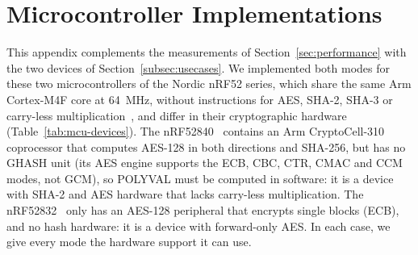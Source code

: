 
\section{Microcontroller Implementations}
\label{app:mcu}

This appendix complements the measurements of Section~\ref{sec:performance}
with the two devices of Section~\ref{subsec:usecases}. We implemented both
modes for these two microcontrollers of the Nordic nRF52 series, which share
the same Arm Cortex-M4F core at 64~MHz, without instructions for AES, SHA-2,
SHA-3 or carry-less multiplication~\cite{armCortexM4TRM}, and differ in their
cryptographic hardware (Table~\ref{tab:mcu-devices}). The
nRF52840~\cite{nrf52840cryptocell} contains an Arm CryptoCell-310 coprocessor that
computes AES-128 in both directions and SHA-256, but has no GHASH unit (its
AES engine supports the ECB, CBC, CTR, CMAC and CCM modes, not GCM), so
POLYVAL must be computed in software: it is a device with SHA-2 and AES
hardware that lacks carry-less multiplication. The
nRF52832~\cite{nrf52832ecb} only has an AES-128 peripheral that encrypts single
blocks (ECB), and no hash hardware: it is a device with forward-only AES. In
each case, we give every mode the hardware support it can use.

